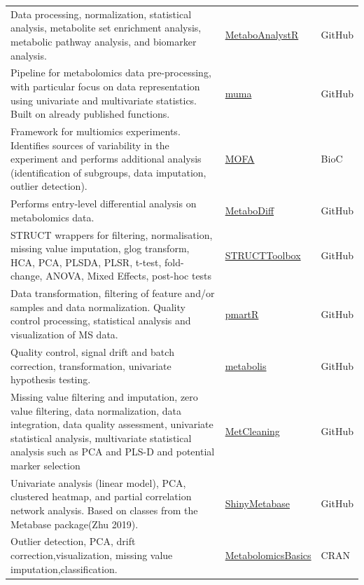 \documentclass[]{article}
\begin{document}
\begin{longtable}{>{\raggedright\arraybackslash}p{30em}>{\raggedright\arraybackslash}p{10em}>{\raggedright\arraybackslash}p{3em}}
\rowcolor{gray!6}  Data processing, normalization, statistical analysis, metabolite set enrichment analysis, metabolic pathway analysis, and biomarker analysis. & \href{https://github.com/xia-lab/MetaboAnalystR}{MetaboAnalystR} & GitHub\\
Pipeline for metabolomics data pre-processing, with particular focus on data representation using univariate and multivariate statistics. Built on already published functions. & \href{https://cran.r-project.org/web/packages/muma/index.html}{muma} & GitHub\\
\rowcolor{gray!6}  Framework for multiomics experiments. Identifies sources of variability in the experiment and performs additional analysis (identification of subgroups, data imputation, outlier detection). & \href{https://www.bioconductor.org/packages/release/bioc/html/MOFA.html}{MOFA} & BioC\\
Performs entry-level differential analysis on metabolomics data. & \href{https://github.com/andreasmock/MetaboDiff}{MetaboDiff} & GitHub\\
\rowcolor{gray!6}  STRUCT wrappers for filtering, normalisation, missing value imputation, glog transform, HCA, PCA, PLSDA, PLSR, t-test, fold-change, ANOVA, Mixed Effects, post-hoc tests & \href{https://github.com/computational-metabolomics/structToolbox}{STRUCTToolbox} & GitHub\\
Data transformation, filtering of feature and/or samples and data normalization. Quality control processing, statistical analysis and visualization of MS data. & \href{https://github.com/pmartR/pmartR}{pmartR} & GitHub\\
\rowcolor{gray!6}  Quality control, signal drift and batch correction, transformation, univariate hypothesis testing. & \href{https://github.com/fgiacomoni/metabolis}{metabolis} & GitHub\\
Missing value filtering and imputation, zero value filtering, data normalization, data integration, data quality assessment, univariate statistical analysis, multivariate statistical analysis such as PCA and PLS-D and potential marker selection & \href{https://github.com/MetabLAB/MetCleaning}{MetCleaning} & GitHub\\
\rowcolor{gray!6}  Univariate analysis (linear model), PCA, clustered heatmap, and partial correlation network analysis. Based on classes from the Metabase package(Zhu 2019). & \href{https://github.com/zhuchcn/ShinyMetabase}{ShinyMetabase} & GitHub\\
Outlier detection, PCA, drift correction,visualization, missing value imputation,classification. & \href{https://cran.r-project.org/package=MetabolomicsBasics}{MetabolomicsBasics} & CRAN\\

\end{longtable}
\end{document}
